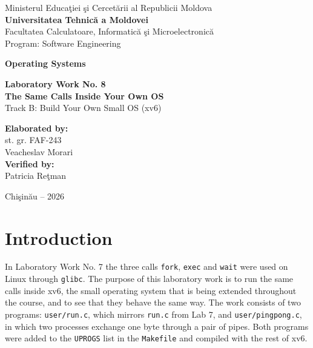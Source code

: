 \documentclass[12pt,a4paper]{article}
\begin{document}
\begin{titlepage}
    \centering
    Ministerul Educa\c{t}iei \c{s}i Cercet\u{a}rii al Republicii Moldova\\[0.4cm]
    \textbf{Universitatea Tehnic\u{a} a Moldovei}\\[0.4cm]
    Facultatea Calculatoare, Informatic\u{a} \c{s}i Microelectronic\u{a}\\[0.2cm]
    Program: Software Engineering

    \vspace{3cm}

    {\LARGE \textbf{Operating Systems}}

    \vspace{1.2cm}

    {\Large \textbf{Laboratory Work No. 8}}\\[0.6cm]
    {\LARGE \textbf{The Same Calls Inside Your Own OS}}\\[0.3cm]
    Track B: Build Your Own Small OS (xv6)

    \vspace{3cm}

    \begin{flushright}
        \textbf{Elaborated by:}\\
        st. gr. FAF-243\\
        Veacheslav Morari\\[0.6cm]
        \textbf{Verified by:}\\
        Patricia Re\c{t}man
    \end{flushright}

    \vfill
    Chi\c{s}in\u{a}u -- 2026
\end{titlepage}

\tableofcontents
\newpage

\section*{Introduction}

In Laboratory Work No. 7 the three calls \texttt{fork}, \texttt{exec} and \texttt{wait} were used on Linux through \texttt{glibc}. The purpose of this laboratory work is to run the same calls inside xv6, the small operating system that is being extended throughout the course, and to see that they behave the same way. The work consists of two programs: \texttt{user/run.c}, which mirrors \texttt{run.c} from Lab 7, and \texttt{user/pingpong.c}, in which two processes exchange one byte through a pair of pipes. Both programs were added to the \texttt{UPROGS} list in the \texttt{Makefile} and compiled with the rest of xv6.
\end{document}
